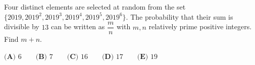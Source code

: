 Four distinct elements are selected at random from the set $\{2019,2019^{2},2019^{3},2019^{4},2019^{5},2019^{6}\}$. The probability that their sum is divisible by $13$ can be written as $\dfrac {m}{n}$ with $m,n$ relatively prime positive integers. Find $m+n$.

$\textbf{(A) }6\qquad\textbf{(B) }7\qquad\textbf{(C) }16\qquad\textbf{(D) }17\qquad\textbf{(E) }19$
